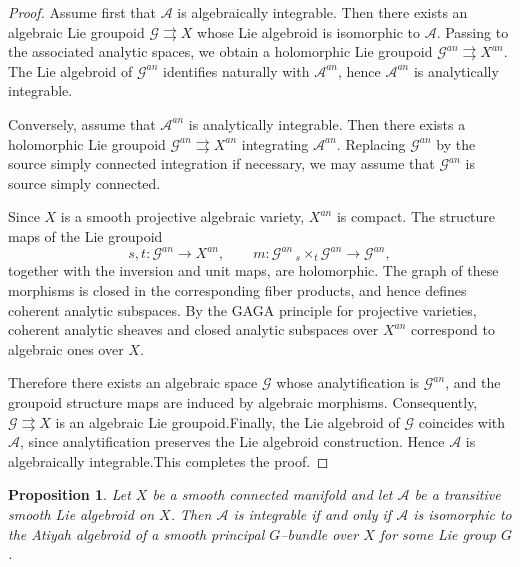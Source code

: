 \documentclass[12pt,reqno]{amsart}
\numberwithin{equation}{subsection}
\newtheorem{proposition}[equation]{Proposition}
\theoremstyle{definition}
\theoremstyle{theorem}
\begin{document}
\begin{proof}
	Assume first that $\mathcal{A}$ is algebraically integrable. Then there
	exists an algebraic Lie groupoid $\mathcal{G} \rightrightarrows X$
	whose Lie algebroid is isomorphic to $\mathcal{A}$. Passing to the
	associated analytic spaces, we obtain a holomorphic Lie groupoid $
	\mathcal{G}^{an} \rightrightarrows X^{an}$.
	The Lie algebroid of $\mathcal{G}^{an}$ identifies naturally with
	$\mathcal{A}^{an}$, hence $\mathcal{A}^{an}$ is analytically integrable.
	
	Conversely, assume that $\mathcal{A}^{an}$ is analytically integrable.
	Then there exists a holomorphic Lie groupoid $\mathcal{G}^{an} \rightrightarrows X^{an}$ integrating $\mathcal{A}^{an}$. Replacing $\mathcal{G}^{an}$ by the source simply connected integration if necessary, we may assume that $\mathcal{G}^{an}$ is source simply connected.
	
	Since $X$ is a smooth projective algebraic variety, $X^{an}$ is compact.
	The structure maps of the Lie groupoid
	\[
	s,t : \mathcal{G}^{an} \longrightarrow X^{an}, \qquad
	m : \mathcal{G}^{an}\,{}_{s}\!\times_{t}\mathcal{G}^{an}
	\longrightarrow \mathcal{G}^{an},
	\]
	together with the inversion and unit maps, are holomorphic. The graph of
	these morphisms is closed in the corresponding fiber products, and hence
	defines coherent analytic subspaces. By the GAGA principle for projective
	varieties, coherent analytic sheaves and closed analytic subspaces over
	$X^{an}$ correspond to algebraic ones over $X$.
	
	Therefore there exists an algebraic space $\mathcal{G}$ whose
	analytification is $\mathcal{G}^{an}$, and the groupoid structure maps
	are induced by algebraic morphisms. Consequently, $\mathcal{G} \rightrightarrows X$ is an algebraic Lie groupoid.Finally, the Lie algebroid of $\mathcal{G}$ coincides with $\mathcal{A}$,
	since analytification preserves the Lie algebroid construction. Hence
	$\mathcal{A}$ is algebraically integrable.This completes the proof.
\end{proof}

\begin{proposition}\label{prop:transitive-integrable-atiyah}
	Let $X$ be a smooth connected manifold and let $\mathcal{A}$ be a transitive smooth Lie algebroid on $X$. Then $\mathcal{A}$ is integrable if and only if $\mathcal{A}$ is isomorphic to the Atiyah algebroid of a smooth principal $G$--bundle over $X$ for some Lie group $G$.
\end{proposition}
\end{document}
